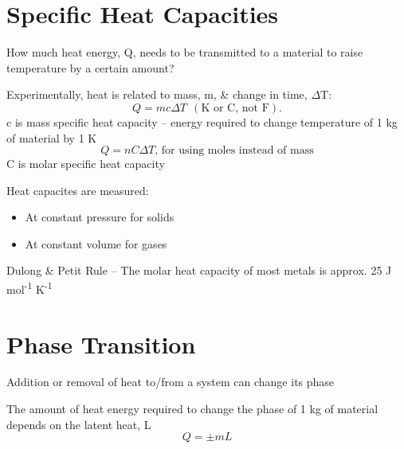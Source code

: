 \documentclass[a4paper, 11pt, normalem]{report}
\begin{document}
\section{Specific Heat Capacities}
How much heat energy, Q, needs to be transmitted to a material to raise temperature by a certain amount?

Experimentally, heat is related to mass, m, \& change in time, ${\Delta}$T:
\begin{equation}
    Q = mc{\Delta}T ~~(\text{K or C, not F}).
\end{equation}
c is mass specific heat capacity -- energy required to change temperature of 1 kg of material by 1 K
\begin{equation}
    Q = nC{\Delta}T\text{, for using moles instead of mass}
\end{equation}
C is molar specific heat capacity

Heat capacites are measured:
\begin{itemize}
    \item At constant pressure for solids
    \item At constant volume for gases
\end{itemize}
Dulong \& Petit Rule -- The molar heat capacity of most metals is approx. 25 J mol\textsuperscript{-1} K\textsuperscript{-1}

\section{Phase Transition}
Addition or removal of heat to/from a system can change its phase

The amount of heat energy required to change the phase of 1 kg of material depends on the latent heat, L
\begin{equation}
    Q = \pm mL
\end{equation}
\end{document}
